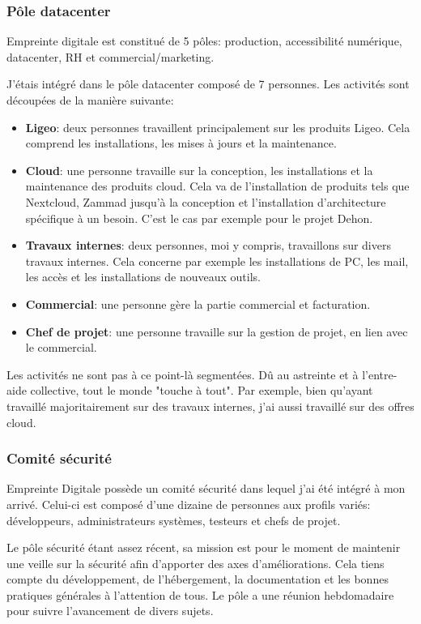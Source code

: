 \documentclass[12pt]{article}
\begin{document}
\subsubsection{Pôle datacenter}
Empreinte digitale est constitué de 5 pôles: production, accessibilité numérique, datacenter, RH et commercial/marketing.

J'étais intégré dans le pôle datacenter composé de 7 personnes. 
Les activités sont découpées de la manière suivante:
\begin{itemize}
    \item \textbf{Ligeo}: deux personnes travaillent principalement sur les produits Ligeo. 
    Cela comprend les installations, les mises à jours et la maintenance.
    \item \textbf{Cloud}: une personne travaille sur la conception, les installations et la maintenance des produits cloud. 
    Cela va de l'installation de produits tels que \gls{Nextcloud}, Zammad jusqu'à la conception et l'installation d'architecture spécifique à un besoin. 
    C'est le cas par exemple pour le projet Dehon.
    \item \textbf{Travaux internes}: deux personnes, moi y compris, travaillons sur divers travaux internes. 
    Cela concerne par exemple les installations de PC, les mail, les accès et les installations de nouveaux outils.
    \item \textbf{Commercial}: une personne gère la partie commercial et facturation.
    \item \textbf{Chef de projet}: une personne travaille sur la gestion de projet, en lien avec le commercial.
\end{itemize}

Les activités ne sont pas à ce point-là segmentées. 
Dû au astreinte et à l'entre-aide collective, tout le monde "touche à tout". 
Par exemple, bien qu'ayant travaillé majoritairement sur des travaux internes, j'ai aussi travaillé sur des offres cloud.

\subsubsection{Comité sécurité}
Empreinte Digitale possède un comité sécurité dans lequel j'ai été intégré à mon arrivé.
Celui-ci est composé d'une dizaine de personnes aux profils variés: développeurs, administrateurs systèmes, testeurs et chefs de projet.

Le pôle sécurité étant assez récent, sa mission est pour le moment de maintenir une veille sur la sécurité afin d'apporter des axes d'améliorations. 
Cela tiens compte du développement, de l'hébergement, la documentation et les bonnes pratiques générales à l'attention de tous. 
Le pôle a une réunion hebdomadaire pour suivre l'avancement de divers sujets.
\end{document}
